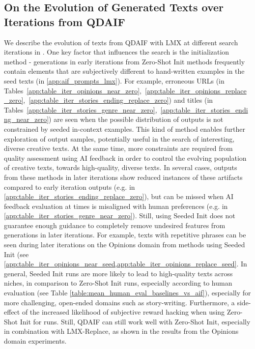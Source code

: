 \clearpage
\newpage
\subsection{On the Evolution of Generated Texts over Iterations from QDAIF}\label{app:iterations_summary_qdaif}
We describe the evolution of texts from QDAIF with LMX at different search iterations in . One key factor that influences the search is the initialization method - generations in early iterations from Zero-Shot Init methods frequently contain elements that are subjectively different to hand-written examples in the seed texts (in \ref{app:aif_prompts_lmx}). For example, erroneous URLs (in Tables~\ref{app:table_iter_opinions_near_zero},~\ref{app:table_iter_opinions_replace_zero},~\ref{app:table_iter_stories_ending_replace_zero}) and titles (in Tables~\ref{app:table_iter_stories_genre_near_zero},~\ref{app:table_iter_stories_ending_near_zero}) are seen when the possible distribution of outputs is not constrained by seeded in-context examples. This kind of method enables further exploration of output samples, potentially useful in the search of interesting, diverse creative texts. At the same time, more constraints are required from quality assessment using AI feedback in order to control the evolving population of creative texts, towards high-quality, diverse texts. In several cases, outputs from these methods in later iterations show reduced instances of these artifacts compared to early iteration outputs (e.g. in \cref{app:table_iter_stories_ending_replace_zero}), but can be missed when AI feedback evaluation at times is misaligned with human preferences (e.g. in \cref{app:table_iter_stories_genre_near_zero}). Still, using Seeded Init does not guarantee enough guidance to completely remove undesired features from generations in later iterations. For example, texts with repetitive phrases can be seen during later iterations on the Opinions domain from methods using Seeded Init (see \cref{app:table_iter_opinions_near_seed,app:table_iter_opinions_replace_seed}. In general, Seeded Init runs are more likely to lead to high-quality texts across niches, in comparison to Zero-Shot Init runs, especially according to human evaluation (see Table \ref{table:mean_human_eval_baselines_vs_aif}), especially for more challenging, open-ended domains such as story-writing. Furthermore, a side-effect of the increased likelihood of subjective reward hacking when using Zero-Shot Init for runs. Still, QDAIF can still work well with Zero-Shot Init, especially in combination with LMX-Replace, as shown in the results from the Opinions domain experiments.

